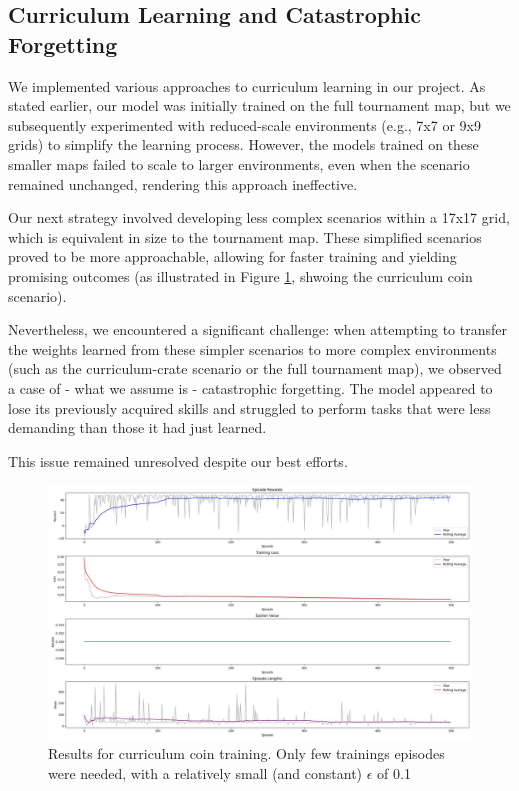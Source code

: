 \documentclass{article} %
\begin{document}
	\subsection{Curriculum Learning and Catastrophic Forgetting}
	We implemented various approaches to curriculum learning in our project. As stated earlier, our model was initially trained on the full tournament map, but we subsequently experimented with reduced-scale environments (e.g., 7x7 or 9x9 grids) to simplify the learning process. However, the models trained on these smaller maps failed to scale to larger environments, even when the scenario remained unchanged, rendering this approach ineffective.
	
	Our next strategy involved developing less complex scenarios within a 17x17 grid, which is equivalent in size to the tournament map. These simplified scenarios proved to be more approachable, allowing for faster training and yielding promising outcomes (as illustrated in Figure \ref{fig:3}, shwoing the curriculum coin scenario).
	
	Nevertheless, we encountered a significant challenge: when attempting to transfer the weights learned from these simpler scenarios to more complex environments (such as the curriculum-crate scenario or the full tournament map), we observed a case of - what we assume is - catastrophic forgetting. The model appeared to lose its previously acquired skills and struggled to perform tasks that were less demanding than those it had just learned.
	
	This issue remained unresolved despite our best efforts.
	
	\begin{figure}[h!]
		\centering
		\includegraphics[width=1.0\textwidth]{images/curriculum_coin}
		\caption{Results for curriculum coin training. Only few trainings episodes were needed, with a relatively small (and constant) $\epsilon$ of 0.1}
		\label{fig:3}
	\end{figure}
	
\end{document}
